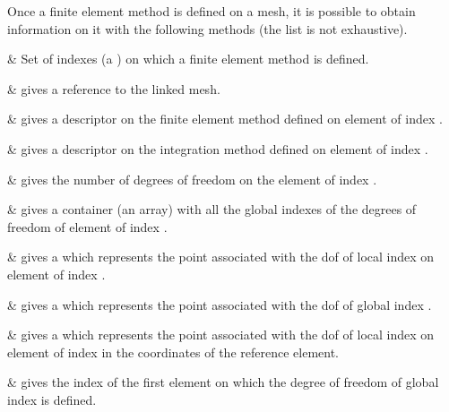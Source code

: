 \documentclass[11pt,a4paper]{article}
\begin{document}
Once a finite element method is defined on a mesh, it is possible to obtain information on it with the following methods (the list is not exhaustive).\\[0.5cm]
\begin{center} 

   & Set of indexes (a ) on which a finite element method is defined.  \\ \hline

   & gives a reference to the linked mesh.  \\ \hline

   & gives a descriptor on the finite element method defined on element of index .  \\ \hline

   & gives a descriptor on the integration method defined on element of index .  \\ \hline

   & gives the number of degrees of freedom on the element of index .  \\ \hline

   & gives a container (an array) with all the global indexes of the degrees of freedom of element of index .  \\ \hline

   & gives a  which represents the point associated with the dof of local index  on element of index .  \\ \hline

   & gives a  which represents the point associated with the dof of global index .  \\ \hline

   & gives a  which represents the point associated with the dof of local index  on element of index  in the coordinates of the reference element.  \\ \hline

   & gives the index of the first element on which the degree of freedom of global index  is defined.  \\ \hline
  

\end{center}
\end{document}
